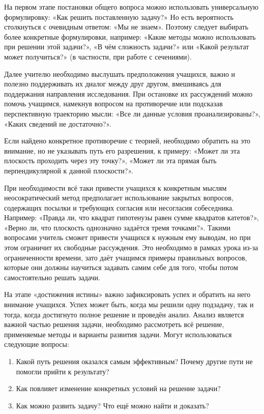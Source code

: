 \documentclass[a4paper,14pt,russian]{extreport}
\begin{document}
На первом этапе постановки общего вопроса можно использовать универсальную формулировку: «Как решить поставленную задачу?» Но есть вероятность столкнуться с очевидным ответом: «Мы не знаем». Поэтому следует выбирать более конкретные формулировки, например: «Какие методы можно использовать при решении этой задачи?», «В чём сложность задачи?» или «Какой результат может получиться?» (в частности, при работе с сечениями).

Далее учителю необходимо выслушать предположения учащихся, важно и полезно поддерживать их диалог между друг другом, вмешиваясь для поддержания направления исследования. При остановке их рассуждений можно помочь учащимся, намекнув вопросом на противоречие или подсказав перспективную траекторию мысли: «Все ли данные условия проанализированы?», «Каких сведений не достаточно?». 

Если найдено конкретное противоречие с теорией, необходимо обратить на это внимание, но не указывать путь его разрешения, к примеру: «Может ли эта плоскость проходить через эту точку?», «Может ли эта прямая быть перпендикулярной к данной плоскости?».

При необходимости всё таки привести учащихся к конкретным мыслям неосократический метод предполагает использование закрытых вопросов, содержащих посылки и требующих согласия или несогласия собеседника. Например: «Правда ли, что квадрат гипотенузы равен сумме квадратов катетов?», «Верно ли, что плоскость однозначно задаётся тремя точками?». Такими вопросами учитель сможет привести учащихся к нужным ему выводам, но при этом ограничит их свободные рассуждения. Это необходимо в рамках урока из-за ограниченности времени, зато даёт учащимся примеры правильных вопросов, которые они должны научиться задавать самим себе для того, чтобы потом самостоятельно решать задачи.

На этапе «достижения истины» важно зафиксировать успех и обратить на него внимание учащихся. Успех может быть, когда мы решили одну подзадачу, так и тогда, когда достигнуто полное решение и проведён анализ. Анализ является важной частью решения задачи, необходимо рассмотреть всё решение, применяемые методы и  варианты развития задачи. Могут использоваться следующие вопросы:

\begin{enumerate}
\item Какой путь решения оказался самым эффективным? Почему другие пути не помогли прийти к результату? 
\item Как повлияет изменение конкретных условий на решение задачи?
\item Как можно развить задачу? Что ещё можно найти и доказать?
\end{enumerate}
\end{document}
